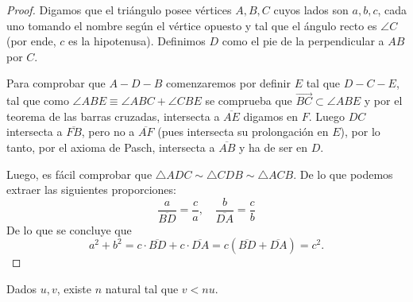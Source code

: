 \documentclass[11pt,a4paper]{book}
\begin{document}
\begin{proof}
Digamos que el triángulo posee vértices $A,B,C$ cuyos lados son $a,b,c$, cada uno tomando el nombre según el vértice opuesto y tal que el ángulo recto es $\angle C$ (por ende, $c$ es la hipotenusa). Definimos $D$ como el pie de la perpendicular a $AB$ por $C$.
\begin{figure}
\centering
{}
\caption{}
\end{figure}

Para comprobar que $A-D-B$ comenzaremos por definir $E$ tal que $D-C-E$, tal que como $\angle ABE\equiv\angle ABC+\angle CBE$ se comprueba que $\overrightarrow{BC}\subset\angle ABE$ y por el teorema de las barras cruzadas, intersecta a $\overline{AE}$ digamos en $F$. Luego $DC$ intersecta a $\overline{FB}$, pero no a $\overline{AF}$ (pues intersecta su prolongación en $E$), por lo tanto, por el axioma de Pasch, intersecta a $\overline{AB}$ y ha de ser en $D$.

Luego, es fácil comprobar que $\triangle ADC\sim\triangle CDB\sim\triangle ACB$. De lo que podemos extraer las siguientes proporciones:
$$\frac{a}{\overline{BD}}=\frac{c}{a},\quad\frac{b}{\overline{DA}}=\frac{c}{b}$$
De lo que se concluye que
$$a^2+b^2=c\cdot\overline{BD}+c\cdot\overline{DA}=c(\overline{BD}+\overline{DA})=c^2.$$
\end{proof}
\begin{axiom}
	Dados $u,v$, existe $n$ natural tal que $v<nu$.
\end{axiom}
\end{document}
